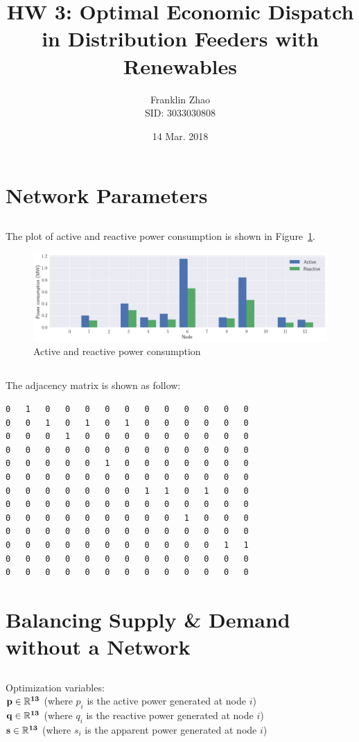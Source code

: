 \documentclass[12pt]{article}
\title{HW 3: Optimal Economic Dispatch in Distribution Feeders with Renewables}
\date{14 Mar. 2018}
\author{Franklin Zhao \\ SID: 3033030808}
\begin{document}
	
	\maketitle
	\newcommand{\tabitem}{~~\llap{\textbullet}~~}
	\renewcommand\theequation{\arabic{equation}}
	\renewcommand{\figurename}{Fig.}
	\renewcommand\thesection{Problem \arabic{section}:}
	\renewcommand\thesubsection{(\alph{subsection})}
	\onehalfspacing
	
\section{Network Parameters}
\subsection{}
The plot of active and reactive power consumption is shown in Figure~\ref{fig:1}.
\begin{figure}[H]
\centering
\includegraphics[width=\linewidth]{1.png}
\vspace{-1cm}      
\caption{Active and reactive power consumption}
\label{fig:1}
\end{figure}
\newpage
\subsection{}
The adjacency matrix is shown as follow:
\begin{verbatim}				
0	1	0	0	0	0	0	0	0	0	0	0	0
0	0	1	0	1	0	1	0	0	0	0	0	0
0	0	0	1	0	0	0	0	0	0	0	0	0
0	0	0	0	0	0	0	0	0	0	0	0	0
0	0	0	0	0	1	0	0	0	0	0	0	0
0	0	0	0	0	0	0	0	0	0	0	0	0
0	0	0	0	0	0	0	1	1	0	1	0	0
0	0	0	0	0	0	0	0	0	0	0	0	0
0	0	0	0	0	0	0	0	0	1	0	0	0
0	0	0	0	0	0	0	0	0	0	0	0	0
0	0	0	0	0	0	0	0	0	0	0	1	1
0	0	0	0	0	0	0	0	0	0	0	0	0
0	0	0	0	0	0	0	0	0	0	0	0	0
\end{verbatim}
\section{Balancing Supply \& Demand without a Network}
\subsection{}
Optimization variables:\\
$\bf{p}\in\mathbb{R}^{13}$ (where $p_i$ is the active power generated at node $i$)\\
$\bf{q}\in\mathbb{R}^{13}$ (where $q_i$ is the reactive power generated at node $i$)\\
$\bf{s}\in\mathbb{R}^{13}$ (where $s_i$ is the apparent power generated at node $i$)
\end{document}
